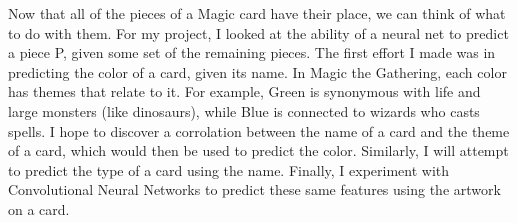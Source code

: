 Now that all of the pieces of a Magic card have their place,
we can think of what to do with them. For my project, I looked
at the ability of a neural net to predict a piece P, given some
set of the remaining pieces. The first effort I made was in predicting 
the color of a card, given its name. In Magic the Gathering, each
color has themes that relate to it. For example, Green is synonymous
with life and large monsters (like dinosaurs), while Blue is connected
to wizards who casts spells. I hope to discover a corrolation between
the name of a card and the theme of a card, which would then be used
to predict the color. Similarly, I will attempt to predict the type
of a card using the name. Finally, I experiment with Convolutional 
Neural Networks to predict these same features using the artwork
on a card.

